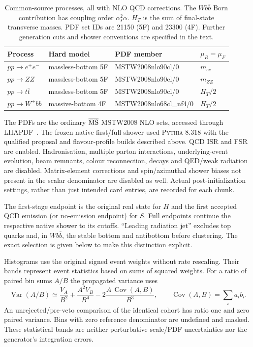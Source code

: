 \documentclass[11pt,a4paper]{article}
\newcommand{\pythia}{\textsc{Pythia}}
\newcommand{\as}{\alpha_s}
\begin{document}
\begin{table}[t]
 \centering\small
 \begin{tabular}{llll}
 \toprule
 Process & Hard model & PDF member & $\mu_R=\mu_F$\\
 \midrule
 $pp\to e^+e^-$ & massless-bottom 5F & MSTW2008nlo90cl/0 & $m_{ee}$\\
 $pp\to ZZ$ & massless-bottom 5F & MSTW2008nlo90cl/0 & $m_{ZZ}$\\
 $pp\to t\bar t$ & massless-bottom 5F & MSTW2008nlo90cl/0 & $H_T/2$\\
 $pp\to W^+b\bar b$ & massive-bottom 4F & MSTW2008nlo68cl\_nf4/0 & $H_T/2$\\
 \bottomrule
 \end{tabular}
 \caption{Common-source processes, all with NLO QCD corrections. The
 $Wb\bar b$ Born contribution has coupling order
 $\as^2\alpha$. $H_T$ is the sum of final-state transverse masses.
 PDF set IDs are 21150 (5F) and 23300 (4F). Further generation cuts and
 shower conventions are specified in the text.}
 \label{tab:setup}
\end{table}

The PDFs are the ordinary $\overline{\rm MS}$ MSTW2008 NLO sets,
accessed through LHAPDF~\cite{MSTW,LHAPDF}. The frozen native first/full shower
used \pythia{} 8.318 with the qualified proposal and flavour-profile
builds described above. QCD ISR and FSR are enabled. Hadronisation,
multiple parton interactions, underlying-event evolution, beam
remnants, colour reconnection, decays and QED/weak radiation are
disabled. Matrix-element corrections and spin/azimuthal shower biases
not present in the scalar denominator are disabled as well. Actual
post-initialization settings, rather than just intended card entries,
are recorded for each chunk.



The first-stage endpoint is the original real state for $H$ and the
first accepted QCD emission (or no-emission endpoint) for $S$. Full
endpoints continue the respective native shower to its cutoffs.
``Leading radiation jet'' excludes top quarks and, in $Wb\bar b$,
the stable bottom and antibottom before clustering. The exact selection is given below to make
this distinction explicit.



Histograms use the original signed event weights without rate
rescaling. Their bands represent event statistics based on sums of
squared weights. For a ratio of paired bin sums $A/B$ the propagated
variance uses
\begin{equation}
 \operatorname{Var}(A/B)\simeq
 \frac{V_A}{B^2}+\frac{A^2V_B}{B^4}
       -2\frac{A\,\operatorname{Cov}(A,B)}{B^3},\qquad
 \operatorname{Cov}(A,B)=\sum_i a_i b_i .
 \label{eq:cov}
\end{equation}
An unrejected/pre-veto comparison of the identical cohort has ratio
one and zero paired variance. Bins with zero reference denominator are
undefined and masked. These statistical bands are neither perturbative
scale/PDF uncertainties nor the generator's integration errors.
\end{document}
